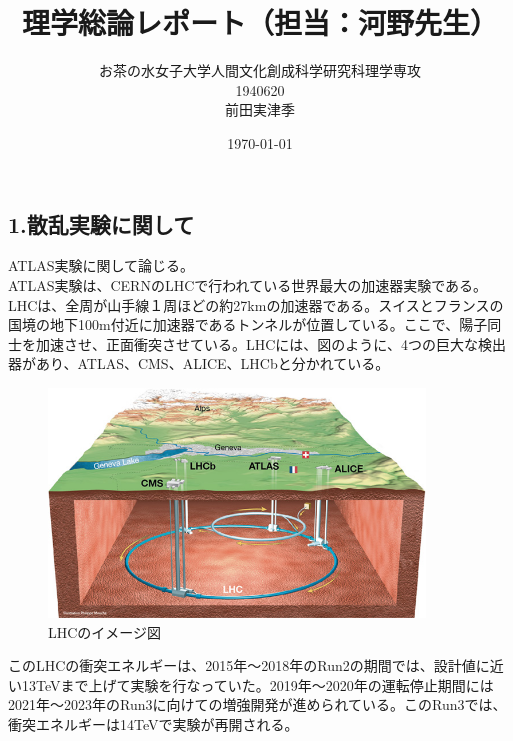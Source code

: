 \documentclass{jreport}
\begin{document}
\title{理学総論レポート（担当：河野先生）}

\author{お茶の水女子大学人間文化創成科学研究科理学専攻 \\1940620 \\ 前田実津季}
\date{\today}
\maketitle

\subsection*{1.散乱実験に関して}
\noindent
ATLAS実験に関して論じる。\\
ATLAS実験は、CERNのLHCで行われている世界最大の加速器実験である。\\
LHCは、全周が山手線１周ほどの約27kmの加速器である。スイスとフランスの国境の地下100m付近に加速器であるトンネルが位置している。ここで、陽子同士を加速させ、正面衝突させている。LHCには、図のように、4つの巨大な検出器があり、ATLAS、CMS、ALICE、LHCbと分かれている。\\
\begin{figure}[htbp]
	\begin{center}
	\includegraphics[width=100mm]{image_atlas_02.jpg}
	\end{center}
	\caption{LHCのイメージ図}
	\label{fig:one}
\end{figure}
このLHCの衝突エネルギーは、2015年〜2018年のRun2の期間では、設計値に近い13TeVまで上げて実験を行なっていた。2019年〜2020年の運転停止期間には2021年〜2023年のRun3に向けての増強開発が進められている。このRun3では、衝突エネルギーは14TeVで実験が再開される。\\
\end{document}
